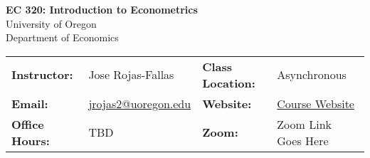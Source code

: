 \begin{center}
\textbf{\huge EC 320: Introduction to Econometrics}\\ 
\vspace{0.1in}
University of Oregon\\ 
Department of Economics\\ 
\end{center}
\vspace{-.2in}
\begin{center}\begin{tabular}{llll}
\toprule
    \textbf{Instructor:} & \footnotesize{Jose Rojas-Fallas} & \textbf{Class Location:}  & {\footnotesize Asynchronous} \\ 
    \textbf{Email:} & \footnotesize{\href{mailto:jrojas2@uoregon.edu}{jrojas2@uoregon.edu}} & 
    \textbf{Website:} & \footnotesize{\hyperlink{https://jrojas1003.github.io/EC-320-Intro-Econometrics/}{Course Website}} \\
    \textbf{Office Hours:} & \footnotesize{TBD} & 
    \textbf{Zoom:} & \footnotesize{Zoom Link Goes Here} \\
\bottomrule
\end{tabular}
\end{center}